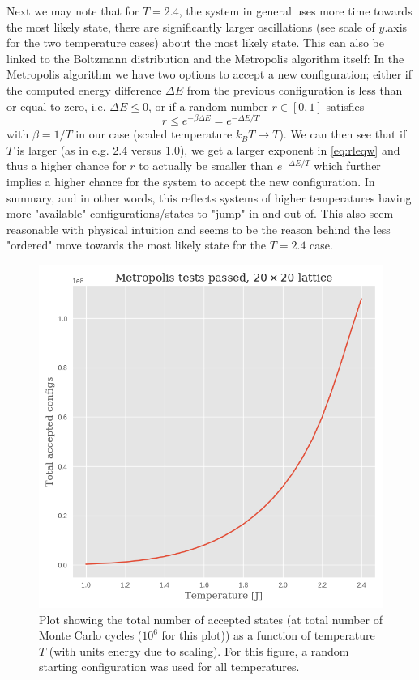 \documentclass[12pt]{article}
\numberwithin{figure}{section}
\numberwithin{table}{section}
\begin{document}
\vspace{0.30cm}
\noindent Next we may note that for $T=2.4$, the system in general uses more time towards the most likely state, there are significantly larger oscillations (see scale of $y$.axis for the two temperature cases) about the most likely state. This can also be linked to the Boltzmann distribution and the Metropolis algorithm itself: In the Metropolis algorithm we have two options to accept a new configuration; either if the computed energy difference $\Delta E$ from the previous configuration is less than or equal to zero, i.e. $\Delta E\leq 0$, or if a random number $r\in[0,1]$ satisfies
\begin{equation}
	r\leq e^{-\beta\Delta E}=e^{-\Delta E/T} \label{eq:rleqw}
\end{equation}
with $\beta=1/T$ in our case (scaled temperature $k_BT\rightarrow T$). We can then see that if $T$ is larger (as in e.g. 2.4 versus 1.0), we get a larger exponent in \eqref{eq:rleqw} and thus a higher chance for $r$ to actually be smaller than $e^{-\Delta E/T}$ which further implies a higher chance for the system to accept the new configuration. In summary, and in other words, this reflects systems of higher temperatures having more "available" configurations/states to "jump" in and out of. This also seem reasonable with physical intuition and seems to be the reason behind the less "ordered" move towards the most likely state for the $T=2.4$ case.
\vspace{0.30cm}

\begin{figure}[ht]
 \centerline{\includegraphics[scale = 0.60]{20x20_accepted_configs}}
 \caption{Plot showing the total number of accepted states (at total number of Monte Carlo cycles ($10^6$ for this plot)) as a function of temperature $T$ (with units energy due to scaling). For this figure, a random starting configuration was used for all temperatures.}
 \label{fig:20x20_AC}
\end{figure}
\end{document}
